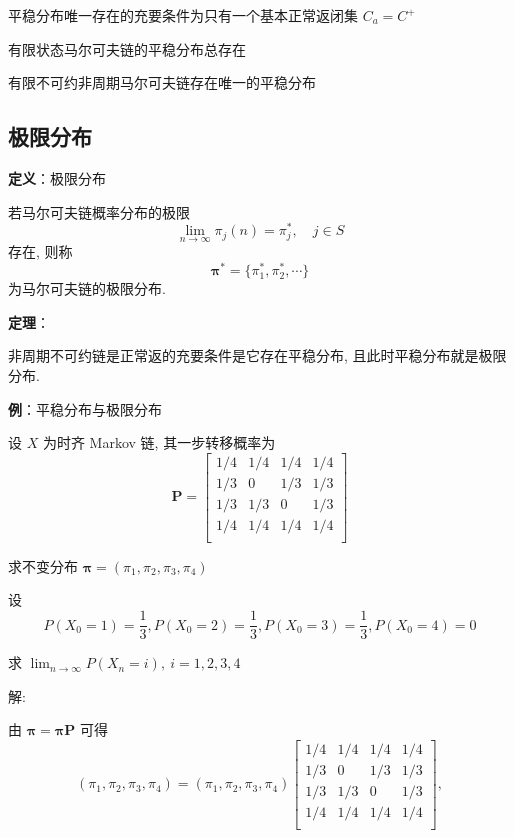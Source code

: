 \documentclass[openany]{ctexbook}
\theoremstyle{kaiti}
\theoremstyle{normal}
\begin{document}
平稳分布唯一存在的充要条件为只有一个基本正常返闭集 $C_a=C^+$

有限状态马尔可夫链的平稳分布总存在

有限不可约非周期马尔可夫链存在唯一的平稳分布

\subsection{极限分布}

\textbf{定义}：极限分布

若马尔可夫链概率分布的极限
\begin{equation}
  \lim_{n\to\infty}\pi_j(n)=\pi_j^*,\quad j\in S
\end{equation}
存在, 则称
\begin{equation}
  \bm{\pi}^*=\{\pi_1^*,\pi_2^*,\cdots\}
\end{equation}
为马尔可夫链的极限分布.

\textbf{定理}：

非周期不可约链是正常返的充要条件是它存在平稳分布, 且此时平稳分布就是极限分布.

\textbf{例}：平稳分布与极限分布

设 $X$ 为时齐 Markov 链, 其一步转移概率为
\begin{equation}
  \bm{P}=
  \begin{bmatrix}
    1/4 & 1/4 & 1/4 & 1/4 \\
    1/3 &  0  & 1/3 & 1/3 \\
    1/3 & 1/3 &  0  & 1/3 \\
    1/4 & 1/4 & 1/4 & 1/4 \\
  \end{bmatrix}
\end{equation}

求不变分布 $\bm{\pi}=(\pi_1,\pi_2,\pi_3,\pi_4)$

设
\begin{equation}
  P(X_0=1)=\frac{1}{3},P(X_0=2)=\frac{1}{3},P(X_0=3)=\frac{1}{3},P(X_0=4)=0
\end{equation}

求 $\lim_{n\to\infty}P(X_n=i),~i=1,2,3,4$

解:

由 $\bm{\pi}=\bm{\pi}\bm{P}$ 可得
\begin{equation}
  (\pi_1,\pi_2,\pi_3,\pi_4)
  =(\pi_1,\pi_2,\pi_3,\pi_4)
  \begin{bmatrix}
    1/4 & 1/4 & 1/4 & 1/4 \\
    1/3 &  0  & 1/3 & 1/3 \\
    1/3 & 1/3 &  0  & 1/3 \\
    1/4 & 1/4 & 1/4 & 1/4 \\
  \end{bmatrix},
\end{equation}
\end{document}
